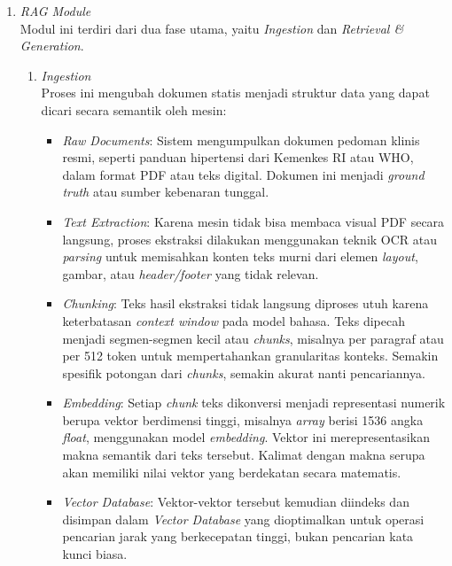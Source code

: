 \begin{enumerate}
    \item \textit{RAG Module} \\
    Modul ini terdiri dari dua fase utama, yaitu \textit{Ingestion} dan \textit{Retrieval \& Generation}.
    \begin{enumerate}[label=\Alph*.]
        \item \textit{Ingestion} \\
        Proses ini mengubah dokumen statis menjadi struktur data yang dapat dicari secara semantik oleh mesin:
        \begin{itemize}
            \item \textit{Raw Documents}: Sistem mengumpulkan dokumen pedoman klinis resmi, seperti panduan hipertensi dari Kemenkes RI atau WHO, dalam format PDF atau teks digital. Dokumen ini menjadi \textit{ground truth} atau sumber kebenaran tunggal.
            \item \textit{Text Extraction}: Karena mesin tidak bisa membaca visual PDF secara langsung, proses ekstraksi dilakukan menggunakan teknik OCR atau \textit{parsing} untuk memisahkan konten teks murni dari elemen \textit{layout}, gambar, atau \textit{header/footer} yang tidak relevan.
            \item \textit{Chunking}: Teks hasil ekstraksi tidak langsung diproses utuh karena keterbatasan \textit{context window} pada model bahasa. Teks dipecah menjadi segmen-segmen kecil atau \textit{chunks}, misalnya per paragraf atau per 512 token untuk mempertahankan granularitas konteks. Semakin spesifik potongan dari \textit{chunks}, semakin akurat nanti pencariannya.
            \item \textit{Embedding}: Setiap \textit{chunk} teks dikonversi menjadi representasi numerik berupa vektor berdimensi tinggi, misalnya \textit{array} berisi 1536 angka \textit{float}, menggunakan model \textit{embedding}. Vektor ini merepresentasikan makna semantik dari teks tersebut. Kalimat dengan makna serupa akan memiliki nilai vektor yang berdekatan secara matematis.
            \item \textit{Vector Database}: Vektor-vektor tersebut kemudian diindeks dan disimpan dalam \textit{Vector Database} yang dioptimalkan untuk operasi pencarian jarak yang berkecepatan tinggi, bukan pencarian kata kunci biasa.
        \end{itemize}


\end{enumerate}
\end{enumerate}
